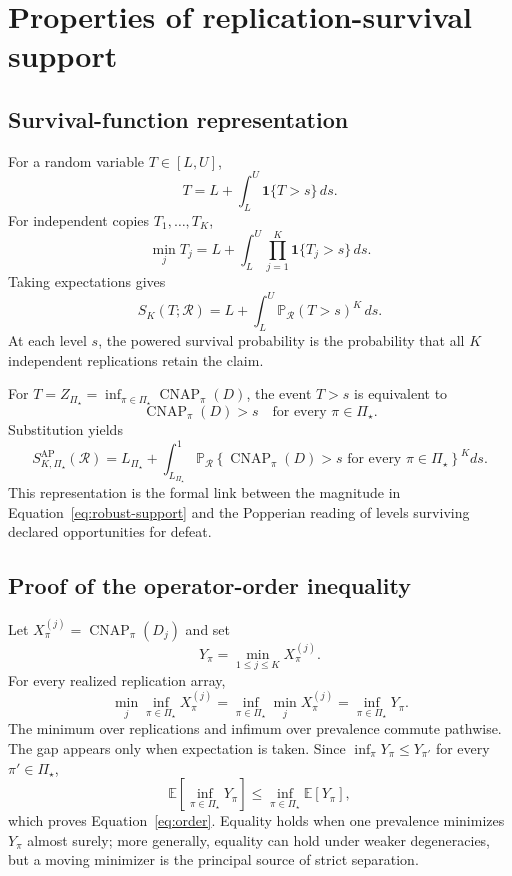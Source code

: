 \documentclass[11pt]{article}
\newcommand{\CNAP}{\operatorname{CNAP}}
\newcommand{\Regime}{\mathcal{R}}
\newcommand{\PSet}{\Pi_\star}
\newcommand{\E}{\mathbb{E}}
\newcommand{\Prb}{\mathbb{P}}
\newcommand{\SRob}{S_{K,\PSet}^{\mathrm{AP}}(\Regime)}
\theoremstyle{remark}
\begin{document}
\section{Properties of replication-survival support}
\label{app:support-proofs}

\subsection{Survival-function representation}

For a random variable $T\in[L,U]$,
\[
T
=
L+\int_L^U\mathbf 1\{T>s\}\,ds.
\]
For independent copies $T_1,\ldots,T_K$,
\[
\min_jT_j
=
L+\int_L^U
\prod_{j=1}^{K}\mathbf 1\{T_j>s\}\,ds.
\]
Taking expectations gives
\begin{equation}
S_K(T;\Regime)
=
L+\int_L^U
\Prb_{\Regime}(T>s)^K\,ds.
\label{eq:survival-representation}
\end{equation}
At each level $s$, the powered survival probability is the probability that all $K$ independent replications retain the claim.

For $T=Z_{\PSet}=\inf_{\pi\in\PSet}\CNAP_\pi(D)$, the event $T>s$ is equivalent to
\[
\CNAP_\pi(D)>s
\quad\text{for every }\pi\in\PSet.
\]
Substitution yields
\begin{equation}
\SRob
=
L_{\PSet}
+
\int_{L_{\PSet}}^1
\Prb_{\Regime}
\left\{
\CNAP_\pi(D)>s
\text{ for every }\pi\in\PSet
\right\}^{K}
ds.
\label{eq:joint-survival}
\end{equation}
This representation is the formal link between the magnitude in Equation~\eqref{eq:robust-support} and the Popperian reading of levels surviving declared opportunities for defeat.

\subsection{Proof of the operator-order inequality}

Let $X_\pi^{(j)}=\CNAP_\pi(D_j)$ and set
\[
Y_\pi=\min_{1\leq j\leq K}X_\pi^{(j)}.
\]
For every realized replication array,
\[
\min_j\inf_{\pi\in\PSet}X_\pi^{(j)}
=
\inf_{\pi\in\PSet}\min_jX_\pi^{(j)}
=
\inf_{\pi\in\PSet}Y_\pi.
\]
The minimum over replications and infimum over prevalence commute pathwise. The gap appears only when expectation is taken. Since $\inf_\pi Y_\pi\leq Y_{\pi'}$ for every $\pi'\in\PSet$,
\[
\E\left[\inf_{\pi\in\PSet}Y_\pi\right]
\leq
\inf_{\pi\in\PSet}\E[Y_\pi],
\]
which proves Equation~\eqref{eq:order}. Equality holds when one prevalence minimizes $Y_\pi$ almost surely; more generally, equality can hold under weaker degeneracies, but a moving minimizer is the principal source of strict separation.
\end{document}
